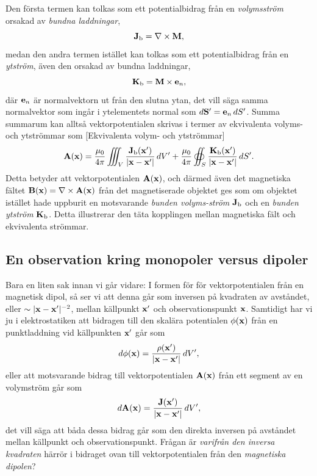 {{{{{Den f{\"o}rsta termen kan tolkas som ett potentialbidrag fr{\aa}n en
{\it volymsstr{\"o}m} orsakad av {\it bundna
laddningar},
$$
  {\bf J}_{\rm b}=\nabla\times{\bf M},
$$
medan den andra termen ist{\"a}llet kan tolkas som ett potentialbidrag fr{\aa}n
en {\it ytstr{\"o}m}, {\"a}ven den orsakad av bundna
laddningar,
$$
  {\bf K}_{\rm b}={\bf M}\times{\bf e}_n,
$$
d{\"a}r ${\bf e}_n$ {\"a}r normalvektorn ut fr{\aa}n den slutna ytan, det
vill s{\"a}ga samma normalvektor som ing{\aa}r i ytelementets normal som
$d{\bf S}'={\bf e}_n\,dS'$. Summa summarum kan allts{\aa} vektorpotentialen
skrivas i termer av ekvivalenta volyms- och ytstr{\"o}mmar som
[Ekvivalenta volym- och ytstr{\"o}mmar]
$$
  {\bf A}({\bf x}) = {{\mu_0}\over{4\pi}}\iiint_V
    {{{\bf J}_{\rm b}({\bf x}')}\over{|{\bf x}-{\bf x}'|}}\,dV'
  +{{\mu_0}\over{4\pi}}\oiint_S
    {{{\bf K}_{\rm b}({\bf x}')}\over{|{\bf x}-{\bf x}'|}}\,dS'.
$$
Detta betyder att vektorpotentialen ${\bf A}({\bf x})$, och d{\"a}rmed {\"a}ven
det magnetiska f{\"a}ltet ${\bf B}({\bf x})=\nabla\times{\bf A}({\bf x})$
fr{\aa}n det magnetiserade objektet ges som om objektet ist{\"a}llet hade
uppburit en motsvarande {\it bunden volyms-str{\"o}m} ${\bf J}_{\rm b}$ och
en {\it bunden ytstr{\"o}m} ${\bf K}_{\rm b}$. Detta illustrerar den t{\"a}ta
kopplingen mellan magnetiska f{\"a}lt och ekvivalenta str{\"o}mmar.
\vfill\eject

\subsection{En observation kring monopoler versus dipoler}
Bara en liten sak innan vi g{\aa}r vidare: I formen f{\"o}r f{\"o}r
vektorpotentialen fr{\aa}n en magnetisk dipol, s{\aa} ser vi att denna g{\aa}r
som inversen p{\aa} kvadraten av avst{\aa}ndet, eller
$\sim|{\bf x}-{\bf x}'|^{-2}$, mellan k{\"a}llpunkt ${\bf x}'$ och
observationspunkt ${\bf x}$.
Samtidigt har vi ju i elektrostatiken att bidragen till den skal{\"a}ra
potentialen $\phi({\bf x})$ fr{\aa}n en punktladdning vid k{\"a}llpunkten
${\bf x}'$ g{\aa}r som
$$
  d\phi({\bf x})={{\rho({\bf x}')}\over{|{\bf x}-{\bf x}'|}}\,dV',
$$
eller att motsvarande bidrag till vektorpotentialen ${\bf A}({\bf x})$ fr{\aa}n
ett segment av en volymstr{\"o}m g{\aa}r som
$$
  d{\bf A}({\bf x})={{{\bf J}({\bf x}')}\over{|{\bf x}-{\bf x}'|}}\,dV',
$$
det vill s{\"a}ga att b{\aa}da dessa bidrag g{\aa}r som den direkta inversen
p{\aa} avst{\aa}ndet mellan k{\"a}llpunkt och observationspunkt.
Fr{\aa}gan {\"a}r {\it varifr{\aa}n den inversa kvadraten} h{\"a}rr{\"o}r i
bidraget ovan till vektorpotentialen fr{\aa}n den {\it magnetiska dipolen}?

}}}}}
